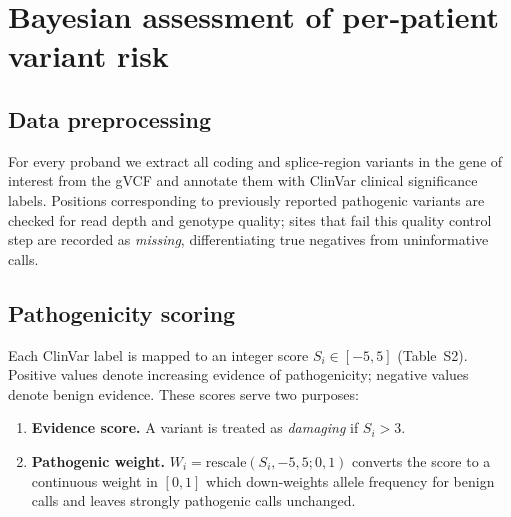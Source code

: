 
\section{Bayesian assessment of per‑patient variant risk}

\subsection{Data preprocessing}

For every proband we extract all coding and splice‑region variants in the gene of
interest from the gVCF and annotate them with ClinVar clinical significance
labels.  Positions corresponding to previously reported pathogenic variants are
checked for read depth and genotype quality; sites that fail this quality
control step are recorded as \textit{missing}, differentiating true negatives
from uninformative calls.

\subsection{Pathogenicity scoring}

Each ClinVar label is mapped to an integer score
$S_i\in[-5,5]$ (Table~S2).  Positive values denote increasing evidence of
pathogenicity; negative values denote benign evidence.
These scores serve two purposes:

\begin{enumerate}
  \item \textbf{Evidence score.}  A variant is treated as
        \textit{damaging} if $S_i>3$.
  \item \textbf{Pathogenic weight.}
        $W_i=\text{rescale}(S_i,-5,5;0,1)$ converts the score
        to a continuous weight in $[0,1]$ which down‑weights allele
        frequency for benign calls and leaves strongly pathogenic calls
        unchanged.
\end{enumerate}

%


